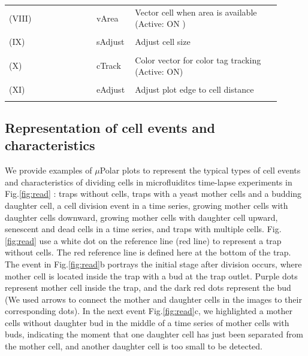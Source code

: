 \documentclass[conference]{IEEEtran}
\begin{document}
\begin{table}[ht]
\begin{tabular}{p{0.3\linewidth}p{0.1\linewidth}p{0.5\linewidth}}
\\
(VIII)& vArea &    Vector cell when area is available (Active: ON ) \\
\\
(IX)& sAdjust &     Adjust cell size\\
\\
(X)& cTrack &      Color vector for color tag tracking (Active:  ON)\\
\\
(XI)& eAdjust &    Adjust plot edge to cell distance\\
\\
\end{tabular}
\label{table:desc}
\end{table}


\subsection{Representation of cell events and characteristics}
We provide examples of $\mu$Polar plots to represent the typical types of cell events and characteristics of dividing cells in microfluiditcs time-lapse experiments in Fig.\ref{fig:read} : traps without cells, traps with a yeast mother cells and a budding daughter cell, a cell division event in a time series,  growing mother cells with daughter cells downward, growing mother cells with daughter cell upward,  senescent and dead cells in a time series, and traps with multiple cells. 
Fig.\ref{fig:read} use a white dot on the reference line (red line) to represent a trap without cells. The red reference line is defined here at the bottom of the trap.
The event in Fig.\ref{fig:read}b portrays
the initial stage after division occurs, where mother cell is located inside the trap with a bud at the trap outlet.  Purple dots represent mother cell inside the trap, and the dark red dots represent the bud (We used arrows to connect the mother and daughter cells in the images to their corresponding dots). In the next event Fig.\ref{fig:read}c, we highlighted a mother cells without daughter bud in the middle of a time series of mother cells with buds, indicating the moment that one daughter cell has just been separated from the mother cell, and another daughter cell is too small to be detected. 
\end{document}
